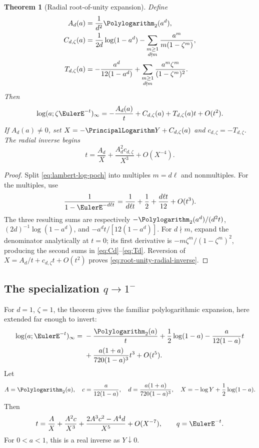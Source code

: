 \documentclass[11pt,a4paper,oneside,openany]{book}
\newtheorem{theorem}{Theorem}[chapter]
\theoremstyle{definition}
\theoremstyle{remark}
\begin{document}
\begin{theorem}[Radial root-of-unity expansion]\label{thm:radial-root-unity}
Define
\begin{align}
 A_d(a)&=\frac1{d^2}\Polylogarithm_2(a^d),\label{eq:Ad}\\
 C_{d,\zeta}(a)
 &=\frac1{2d}\log(1-a^d)
 -\sum_{\substack{m\ge1\\d\nmid m}}
 \frac{a^m}{m(1-\zeta^m)},\label{eq:Cd}\\
 T_{d,\zeta}(a)
 &=-\frac{a^d}{12(1-a^d)}
 +\sum_{\substack{m\ge1\\d\nmid m}}
 \frac{a^m\zeta^m}{(1-\zeta^m)^2}.
\label{eq:Td}
\end{align}
Then
\begin{equation}\label{eq:root-unity-radial-expansion}
 \log(a;\zeta\EulerE^{-t})_\infty
 =-\frac{A_d(a)}{t}+C_{d,\zeta}(a)
 +T_{d,\zeta}(a)t+O(t^2).
\end{equation}
If \(A_d(a)\ne0\), set
\(X=-\PrincipalLogarithm Y+C_{d,\zeta}(a)\) and
\(c_{d,\zeta}=-T_{d,\zeta}\).  The radial inverse begins
\begin{equation}\label{eq:root-unity-radial-inverse}
 t=\frac{A_d}{X}+\frac{A_d^2c_{d,\zeta}}{X^3}+O(X^{-4}).
\end{equation}
\end{theorem}

\begin{proof}
Split \eqref{eq:lambert-log-poch} into multiples \(m=d\ell\) and
nonmultiples.  For the multiples, use
\[
 \frac1{1-\EulerE^{-d\ell t}}
 =\frac1{d\ell t}+\frac12+\frac{d\ell t}{12}+O(t^3).
\]
The three resulting sums are respectively
\(-\Polylogarithm_2(a^d)/(d^2t)\), \((2d)^{-1}\log(1-a^d)\), and
\(-a^dt/[12(1-a^d)]\).  For \(d\nmid m\), expand the denominator
analytically at \(t=0\); its first derivative is
\(-m\zeta^m/(1-\zeta^m)^2\), producing the second sums in
\eqref{eq:Cd}--\eqref{eq:Td}.  Reversion of
\(X=A_d/t+c_{d,\zeta}t+O(t^2)\) proves
\eqref{eq:root-unity-radial-inverse}.
\end{proof}

\subsection{The specialization \texorpdfstring{$q\to1^-$}{q to 1}}

For \(d=1\), \(\zeta=1\), the theorem gives the familiar
polylogarithmic expansion, here extended far enough to invert:
\begin{align}
 \log(a;\EulerE^{-t})_\infty
 ={}&-\frac{\Polylogarithm_2(a)}t+\frac12\log(1-a)
 -\frac{a}{12(1-a)}t\notag\\
 &+\frac{a(1+a)}{720(1-a)^3}t^3+O(t^5).
\label{eq:qone-infinite-forward}
\end{align}
Let
\[
 A=\Polylogarithm_2(a),\quad c=\frac{a}{12(1-a)},\quad
 d=\frac{a(1+a)}{720(1-a)^3},\quad
 X=-\log Y+\frac12\log(1-a).
\]
Then
\begin{equation}\label{eq:qone-infinite-inverse}
 t=\frac AX+\frac{A^2c}{X^3}
 +\frac{2A^3c^2-A^4d}{X^5}+O(X^{-7}),
 \qquad q=\EulerE^{-t}.
\end{equation}
For \(0<a<1\), this is a real inverse as \(Y\downarrow0\).
\end{document}
